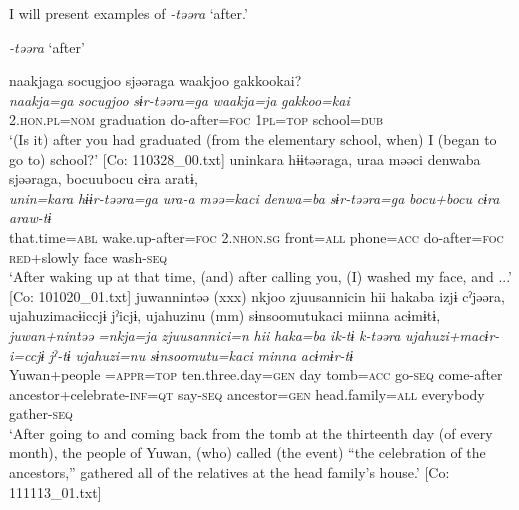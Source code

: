 I will present examples of \textit{-təəra} ‘after.’

\ea\label{ex:8-100}
  \textit{-təəra} ‘after’

\ea [= (\ref{ex:6-117}d)]

{\TM}
\glll  naakjaga  {\textbar}socugjoo{\textbar}  sjəəraga  waakjoo  {\textbar}gakkoo{\textbar}kai?\\
\textit{naakja=ga}  \textit{socugjoo}  \textit{sɨr-təəra=ga}  \textit{waakja=ja}  \textit{gakkoo=kai}\\
2.\textsc{hon}.\textsc{pl}=\textsc{nom}  graduation  do-after=\textsc{foc}  1\textsc{pl}=\textsc{top}  school=\textsc{dub}\\
\glt ‘(Is it) after you had graduated (from the elementary school, when) I (began to go to) school?’ [Co: 110328\_00.txt]
\ex
{\TM}
\glll  uninkara  hɨɨtəəraga,  uraa  məəci  {\textbar}denwa{\textbar}ba   sjəəraga,  bocuubocu  cɨra  aratɨ,\\
\textit{unin=kara}  \textit{hɨɨr-təəra=ga}  \textit{ura-a}  \textit{məə=kaci}  \textit{denwa=ba}      \textit{sɨr-təəra=ga}  \textit{bocu+bocu}  \textit{cɨra}  \textit{araw-tɨ}\\
that.time=\textsc{abl}  wake.up-after=\textsc{foc}  2.\textsc{nhon}.\textsc{sg}  front=\textsc{all}  phone=\textsc{acc}  do-after=\textsc{foc}  \textsc{red}+slowly  face  wash-\textsc{seq}\\
\glt ‘After waking up at that time, (and) after calling you, (I) washed my face, and ...’ [Co: 101020\_01.txt]
\ex
{\TM}
\glll  juwannintəə  (xxx)  nkjoo  {\textbar}zjuusannici{\textbar}n  hii    hakaba  izjɨ  cˀjəəra,  ujahuzimacɨiccjɨ  jˀicjɨ,    ujahuzinu  (mm)  sɨnsoomutukaci  miinna  acɨmɨtɨ,\\
\textit{juwan+nintəə}    \textit{=nkja=ja}  \textit{zjuusannici=n}  \textit{hii}   \textit{haka=ba}  \textit{ik-tɨ}  \textit{k-təəra}  \textit{ujahuzi+macɨr-i=ccjɨ}  \textit{jˀ-tɨ}   \textit{ujahuzi=nu}    \textit{sɨnsoomutu=kaci}  \textit{minna}  \textit{acɨmɨr-tɨ}\\
Yuwan+people    =\textsc{appr}=\textsc{top}  ten.three.day=\textsc{gen}  day   tomb=\textsc{acc}  go-\textsc{seq}  come-after  ancestor+celebrate-\textsc{inf}=\textsc{qt}  say-\textsc{seq}    ancestor=\textsc{gen}    head.family=\textsc{all}  everybody  gather-\textsc{seq}\\
\glt ‘After going to and coming back from the tomb at the thirteenth day (of every month), the people of Yuwan, (who) called (the event) “the celebration of the ancestors,” gathered all of the relatives at the head family’s house.’ [Co: 111113\_01.txt]

